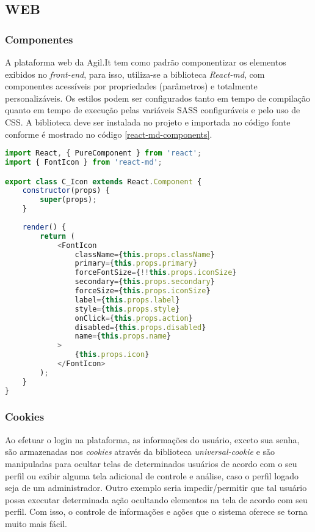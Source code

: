 \subsection{WEB}
\subsubsection{Componentes}
A plataforma web da Agil.It tem como padrão componentizar os elementos exibidos no \textit{front-end}, para isso, utiliza-se a biblioteca \textit{React-md}, com componentes acessíveis por propriedades (parâmetros) e totalmente personalizáveis. Os estilos podem ser configurados tanto em tempo de compilação quanto em tempo de execução pelas variáveis SASS configuráveis e pelo uso de CSS.
A biblioteca deve ser instalada no projeto e importada no código fonte conforme é mostrado no código \ref{react-md-components}.

\begin{lstlisting}[language=JavaScript, caption={Importando o componente de Ícone do react-md}, label={react-md-components}]
import React, { PureComponent } from 'react';
import { FontIcon } from 'react-md';

export class C_Icon extends React.Component {
	constructor(props) {
		super(props);
	}
	
	render() {
		return (
			<FontIcon 
				className={this.props.className}
				primary={this.props.primary}
				forceFontSize={!!this.props.iconSize}
				secondary={this.props.secondary}
				forceSize={this.props.iconSize}
				label={this.props.label}
				style={this.props.style}
				onClick={this.props.action}
				disabled={this.props.disabled}
				name={this.props.name}
			>
				{this.props.icon}
			</FontIcon>
		);
	}
}
\end{lstlisting}

\subsubsection{Cookies}
Ao efetuar o login na plataforma, as informações do usuário, exceto sua senha, são armazenadas nos \textit{cookies} através da biblioteca \textit{universal-cookie} e são manipuladas para ocultar telas de determinados usuários de acordo com o seu perfil ou exibir alguma tela adicional de controle e análise, caso o perfil logado seja de um administrador. Outro exemplo seria impedir/permitir que tal usuário possa executar determinada ação ocultando elementos na tela de acordo com seu perfil.
Com isso, o controle de informações e ações que o sistema oferece se torna muito mais fácil.

